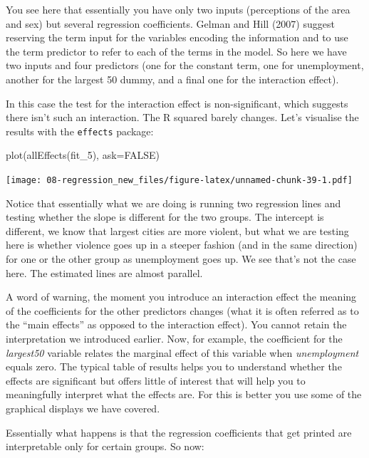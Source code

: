 \documentclass[
]{book}
\newenvironment{Shaded}{\begin{snugshade}}{\end{snugshade}}
\newcommand{\AttributeTok}[1]{\textcolor[rgb]{0.77,0.63,0.00}{#1}}
\newcommand{\ConstantTok}[1]{\textcolor[rgb]{0.00,0.00,0.00}{#1}}
\newcommand{\FunctionTok}[1]{\textcolor[rgb]{0.00,0.00,0.00}{#1}}
\newcommand{\NormalTok}[1]{#1}
\begin{document}
You see here that essentially you have only two inputs (perceptions of the area and sex) but several regression coefficients. Gelman and Hill (2007) suggest reserving the term input for the variables encoding the information and to use the term predictor to refer to each of the terms in the model. So here we have two inputs and four predictors (one for the constant term, one for unemployment, another for the largest 50 dummy, and a final one for the interaction effect).

In this case the test for the interaction effect is non-significant, which suggests there isn't such an interaction. The R squared barely changes. Let's visualise the results with the \texttt{effects} package:

\begin{Shaded}
\begin{Highlighting}[]
\FunctionTok{plot}\NormalTok{(}\FunctionTok{allEffects}\NormalTok{(fit\_5), }\AttributeTok{ask=}\ConstantTok{FALSE}\NormalTok{)}
\end{Highlighting}
\end{Shaded}

\texttt{[image: 08-regression\_new\_files/figure-latex/unnamed-chunk-39-1.pdf]}

Notice that essentially what we are doing is running two regression lines and testing whether the slope is different for the two groups. The intercept is different, we know that largest cities are more violent, but what we are testing here is whether violence goes up in a steeper fashion (and in the same direction) for one or the other group as unemployment goes up. We see that's not the case here. The estimated lines are almost parallel.

A word of warning, the moment you introduce an interaction effect the meaning of the coefficients for the other predictors changes (what it is often referred as to the ``main effects'' as opposed to the interaction effect). You cannot retain the interpretation we introduced earlier. Now, for example, the coefficient for the \emph{largest50} variable relates the marginal effect of this variable when \emph{unemployment} equals zero. The typical table of results helps you to understand whether the effects are significant but offers little of interest that will help you to meaningfully interpret what the effects are. For this is better you use some of the graphical displays we have covered.

Essentially what happens is that the regression coefficients that get printed are interpretable only for certain groups. So now:
\end{document}
